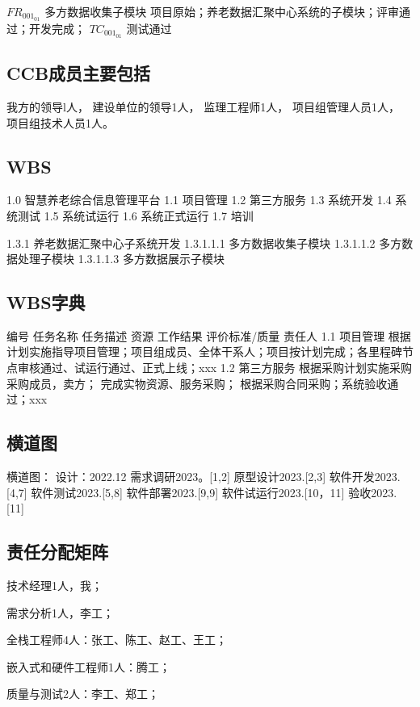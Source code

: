 \documentclass[UTF8]{../computerUniverse}
\begin{document}
$FR_001_01$   多方数据收集子模块
项目原始；养老数据汇聚中心系统的子模块；评审通过；开发完成；    $TC_001_01$  测试通过

\subsection{CCB成员主要包括}

我方的领导l人，
建设单位的领导1人，
监理工程师1人，
项目组管理人员1人，
项目组技术人员1人。


\subsection{WBS}

1.0 智慧养老综合信息管理平台
1.1 项目管理
1.2 第三方服务
1.3 系统开发
1.4 系统测试
1.5 系统试运行
1.6 系统正式运行
1.7 培训

1.3.1 养老数据汇聚中心子系统开发
1.3.1.1.1 多方数据收集子模块
1.3.1.1.2 多方数据处理子模块
1.3.1.1.3 多方数据展示子模块

\subsection{WBS字典}

编号    任务名称    任务描述    资源    工作结果    评价标准/质量    责任人
1.1 项目管理        根据计划实施指导项目管理；项目组成员、全体干系人；项目按计划完成；各里程碑节点审核通过、试运行通过、正式上线；xxx
1.2 第三方服务      根据采购计划实施采购    采购成员，卖方；  完成实物资源、服务采购；    根据采购合同采购；系统验收通过；xxx    


\subsection{横道图}
横道图：
设计：2022.12
需求调研2023。[1,2]
原型设计2023.[2,3]
软件开发2023.[4,7]
软件测试2023.[5,8]
软件部署2023.[9,9]
软件试运行2023.[10，11]
验收2023.[11]



\subsection{责任分配矩阵}
技术经理1人，我；

需求分析1人，李工；

全栈工程师4人：张工、陈工、赵工、王工；

嵌入式和硬件工程师1人：腾工；

质量与测试2人：李工、郑工；
\end{document}
